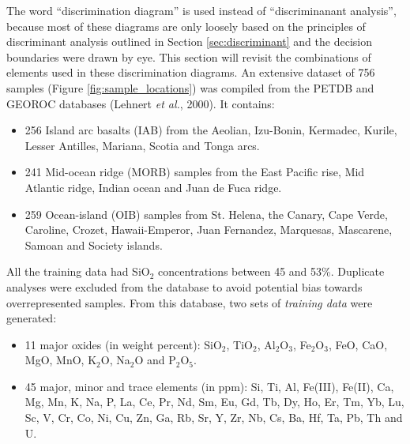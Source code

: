 \documentclass{article}
\begin{document}
The   word    ``discrimination   diagram''   is    used   instead   of
``discriminanant analysis'',  because most of these  diagrams are only
loosely based  on the principles of discriminant  analysis outlined in
Section \ref{sec:discriminant} and  the decision boundaries were drawn
by eye. This section will revisit the combinations of elements used in
these discrimination  diagrams.  An  extensive dataset of  756 samples
(Figure  \ref{fig:sample_locations}) was compiled  from the  PETDB and
GEOROC databases (Lehnert {\it et al.}, 2000).  It contains:

\begin{itemize}
\item  256  Island arc  basalts  (IAB)  from  the Aeolian,  Izu-Bonin,
Kermadec, Kurile, Lesser Antilles, Mariana, Scotia and Tonga arcs.
\item 241 Mid-ocean  ridge (MORB) samples from the  East Pacific rise,
Mid Atlantic ridge, Indian ocean and Juan de Fuca ridge.
\item 259 Ocean-island (OIB) samples from St. Helena, the Canary, Cape
Verde, Caroline, Crozet, Hawaii-Emperor, Juan Fernandez, Marquesas, Mascarene,
Samoan and Society islands.
\end{itemize}

All the training data had  SiO$_2$ concentrations between 45 and 53\%.
Duplicate analyses were excluded  from the database to avoid potential
bias towards overrepresented samples.  From this database, two sets of
{\it training data} were generated:

\begin{itemize}
\item  11   major  oxides  (in  weight   percent):  SiO$_2$,  TiO$_2$,
Al$_2$O$_3$,  Fe$_2$O$_3$, FeO,  CaO,  MgO, MnO,  K$_2$O, Na$_2$O  and
P$_2$O$_5$.
\item  45  major, minor  and  trace elements  (in  ppm):  Si, Ti,  Al,
Fe(III), Fe(II), Ca, Mg, Mn, K, Na, P, La, Ce, Pr, Nd, Sm, Eu, Gd, Tb,
Dy, Ho, Er, Tm, Yb, Lu, Sc, V,  Cr, Co, Ni, Cu, Zn, Ga, Rb, Sr, Y, Zr,
Nb, Cs, Ba, Hf, Ta, Pb, Th and U.
\end{itemize}
\end{document}
